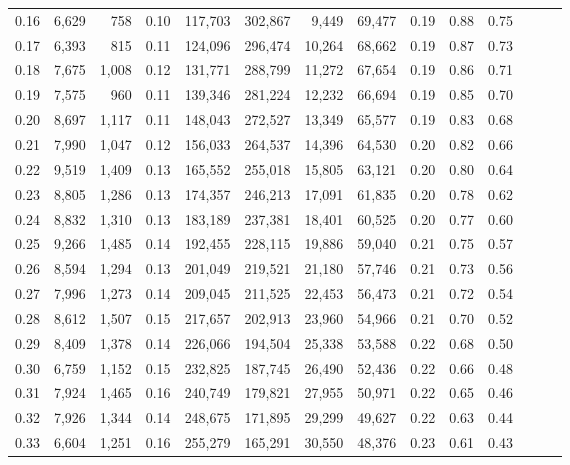 \begin{tabular}{rrrrrrrrrrrrrr}
0.16 &   6,629 &    758 &  0.10 &  117,703 &  302,867 &   9,449 &  69,477 &  0.19 &  0.88 &      0.75 \\
0.17 &   6,393 &    815 &  0.11 &  124,096 &  296,474 &  10,264 &  68,662 &  0.19 &  0.87 &      0.73 \\
0.18 &   7,675 &  1,008 &  0.12 &  131,771 &  288,799 &  11,272 &  67,654 &  0.19 &  0.86 &      0.71 \\
0.19 &   7,575 &    960 &  0.11 &  139,346 &  281,224 &  12,232 &  66,694 &  0.19 &  0.85 &      0.70 \\
0.20 &   8,697 &  1,117 &  0.11 &  148,043 &  272,527 &  13,349 &  65,577 &  0.19 &  0.83 &      0.68 \\
0.21 &   7,990 &  1,047 &  0.12 &  156,033 &  264,537 &  14,396 &  64,530 &  0.20 &  0.82 &      0.66 \\
0.22 &   9,519 &  1,409 &  0.13 &  165,552 &  255,018 &  15,805 &  63,121 &  0.20 &  0.80 &      0.64 \\
0.23 &   8,805 &  1,286 &  0.13 &  174,357 &  246,213 &  17,091 &  61,835 &  0.20 &  0.78 &      0.62 \\
0.24 &   8,832 &  1,310 &  0.13 &  183,189 &  237,381 &  18,401 &  60,525 &  0.20 &  0.77 &      0.60 \\
0.25 &   9,266 &  1,485 &  0.14 &  192,455 &  228,115 &  19,886 &  59,040 &  0.21 &  0.75 &      0.57 \\
0.26 &   8,594 &  1,294 &  0.13 &  201,049 &  219,521 &  21,180 &  57,746 &  0.21 &  0.73 &      0.56 \\
0.27 &   7,996 &  1,273 &  0.14 &  209,045 &  211,525 &  22,453 &  56,473 &  0.21 &  0.72 &      0.54 \\
0.28 &   8,612 &  1,507 &  0.15 &  217,657 &  202,913 &  23,960 &  54,966 &  0.21 &  0.70 &      0.52 \\
0.29 &   8,409 &  1,378 &  0.14 &  226,066 &  194,504 &  25,338 &  53,588 &  0.22 &  0.68 &      0.50 \\
0.30 &   6,759 &  1,152 &  0.15 &  232,825 &  187,745 &  26,490 &  52,436 &  0.22 &  0.66 &      0.48 \\
0.31 &   7,924 &  1,465 &  0.16 &  240,749 &  179,821 &  27,955 &  50,971 &  0.22 &  0.65 &      0.46 \\
0.32 &   7,926 &  1,344 &  0.14 &  248,675 &  171,895 &  29,299 &  49,627 &  0.22 &  0.63 &      0.44 \\
0.33 &   6,604 &  1,251 &  0.16 &  255,279 &  165,291 &  30,550 &  48,376 &  0.23 &  0.61 &      0.43 \\

\end{tabular}
